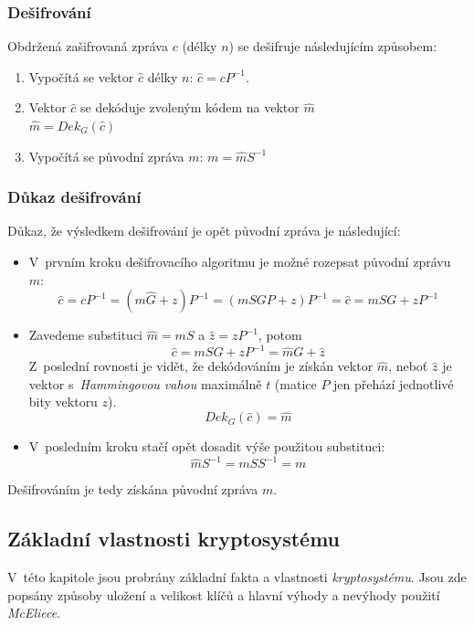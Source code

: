 \documentclass[thesis=M,czech,hidelinks]{FITthesis}[2012/06/26]
\newcommand{\0}{{\textcolor[gray]{0.80}{0}}}
\begin{document}
\subsubsection{Dešifrování}
Obdržená zašifrovaná zpráva $c$ (délky $n$) se dešifruje následujícím způsobem:

\begin{enumerate}
    \item Vypočítá se vektor $\hat{c}$ délky $n$: $\hat{c} = c P^{-1}$.
    \item Vektor $\hat{c}$ se dekóduje zvoleným kódem na vektor $\hat{m}$ \\
        $\hat{m} = Dek_{G}\left(\hat{c}\right)$
    \item Vypočítá se původní zpráva $m$: $m = \hat{m} S^{-1}$
\end{enumerate}

\subsubsection{Důkaz dešifrování}\label{kap_dukaz_desifrovani}
Důkaz, že výsledkem dešifrování je opět původní zpráva je následující:

\begin{itemize}
    \item V~prvním kroku dešifrovacího algoritmu je možné rozepsat původní
        zprávu~$m$:
        $$ \hat{c} = c P^{-1} = \left( m \hat{G} + z \right) P^{-1} =
        \left(m S G P + z \right) P^{-1} = \hat{c} = m S G + z P^{-1} $$
    \item Zavedeme substituci $\hat{m} = m S$ a $\hat{z} = z P^{-1}$, potom
        $$ \hat{c} = m S G + z P^{-1} = \hat{m} G + \hat{z} $$
        Z~poslední rovnosti je vidět, že dekódováním je získán vektor $\hat{m}$,
        neboť $\hat{z}$ je vektor s~\emph{Hammingovou vahou} maximálně $t$
        (matice $P$ jen přehází jednotlivé bity vektoru $z$).
        $$ Dek_{G}\left(\hat{c}\right) = \hat{m} $$
    \item V~posledním kroku stačí opět dosadit výše použitou substituci:
        $$ \hat{m} S^{-1} = m S S^{-1} = m $$
\end{itemize}

Dešifrováním je tedy získána původní zpráva $m$.

\subsection{Základní vlastnosti kryptosystému}
V~této kapitole jsou probrány základní fakta a vlastnosti \emph{kryptosystému}.
Jsou zde popsány způsoby uložení a velikost klíčů a hlavní výhody a nevýhody
použití \emph{McEliece}.
\end{document}
